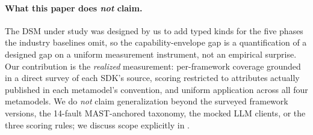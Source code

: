 \documentclass[a4paper,UKenglish,cleveref,autoref,thm-restate]{lipics-v2021}
\begin{document}
\paragraph*{What this paper does \emph{not} claim.}
The DSM under study was designed by us to add typed kinds for the
five phases the industry baselines omit, so the capability-envelope
gap is a quantification of a designed gap on a uniform measurement
instrument, not an empirical surprise. Our contribution is the
\emph{realized} measurement: per-framework coverage grounded in a
direct survey of each SDK's source, scoring restricted to attributes
actually published in each metamodel's convention, and uniform
application across all four metamodels. We do \emph{not} claim
generalization beyond the surveyed framework versions, the 14-fault
MAST-anchored taxonomy, the mocked LLM clients, or the three scoring
rules; we discuss scope explicitly in .
\end{document}
